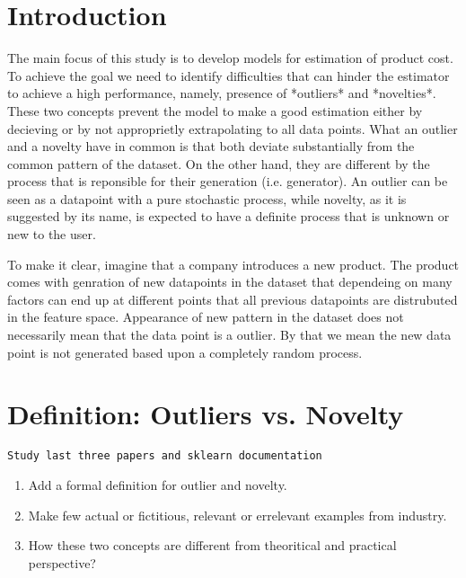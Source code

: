 \documentclass{article}
\begin{document}
\section{Introduction}

   The main focus of this study is to develop models for estimation of
   product cost. To achieve the goal we need to identify difficulties
   that can hinder the estimator to achieve a high performance,
   namely, presence of *outliers* and *novelties*. These two concepts
   prevent the model to make a good estimation either by decieving or
   by not approprietly extrapolating to all data points. What an
   outlier and a novelty have in common is that both deviate
   substantially from the common pattern of the dataset.  On the other
   hand, they are different by the process that is reponsible for
   their generation (i.e. generator). An outlier can be seen as a
   datapoint with a pure stochastic process, while novelty, as it is
   suggested by its name, is expected to have a definite process that
   is unknown or new to the user.

   To make it clear, imagine that a company introduces a new
   product. The product comes with genration of new datapoints in
   the dataset that dependeing on many factors can end up at different
   points that all previous datapoints are distrubuted in the feature
   space. Appearance of new pattern in the dataset does not
   necessarily mean that the data point is a outlier. By that we mean
   the new data point is not generated based upon a completely random
   process.

\section{Definition: Outliers vs. Novelty}

\texttt{Study last three papers and sklearn documentation}


\begin{enumerate}
\item Add a formal definition for outlier and novelty.
\item Make few actual or fictitious, relevant or errelevant examples from industry.
\item How these two concepts are different from theoritical and practical perspective?
\end{enumerate}

\end{document}
